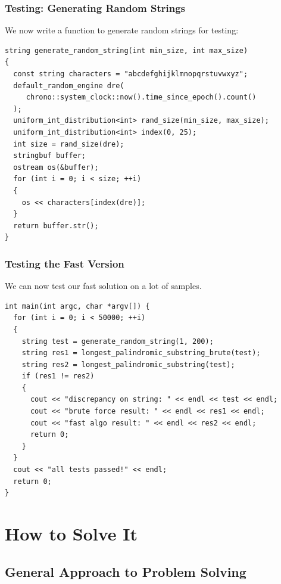 \documentclass{beamer}
\begin{document}
\begin{frame}[containsverbatim]
\frametitle{Testing: Generating Random Strings}

\scriptsize

We now write a function to generate random strings for testing:

\vspace{0.2cm}

\begin{lstlisting}
string generate_random_string(int min_size, int max_size)
{
  const string characters = "abcdefghijklmnopqrstuvwxyz";
  default_random_engine dre(
     chrono::system_clock::now().time_since_epoch().count()
  );
  uniform_int_distribution<int> rand_size(min_size, max_size);
  uniform_int_distribution<int> index(0, 25);
  int size = rand_size(dre);
  stringbuf buffer;
  ostream os(&buffer);
  for (int i = 0; i < size; ++i)
  {
    os << characters[index(dre)];
  }
  return buffer.str();
}
\end{lstlisting}

\end{frame}

\begin{frame}[containsverbatim]
\frametitle{Testing the Fast Version}

\scriptsize

We can now test our fast solution on a lot of samples.

\vspace{0.2cm}

\begin{lstlisting}
int main(int argc, char *argv[]) {
  for (int i = 0; i < 50000; ++i)
  {
    string test = generate_random_string(1, 200);
    string res1 = longest_palindromic_substring_brute(test);
    string res2 = longest_palindromic_substring(test);
    if (res1 != res2)
    {
      cout << "discrepancy on string: " << endl << test << endl;
      cout << "brute force result: " << endl << res1 << endl;
      cout << "fast algo result: " << endl << res2 << endl;
      return 0;
    }
  }
  cout << "all tests passed!" << endl;
  return 0;
}
\end{lstlisting}

\end{frame}

\section{How to Solve It}

\subsection{General Approach to Problem Solving}
\end{document}
